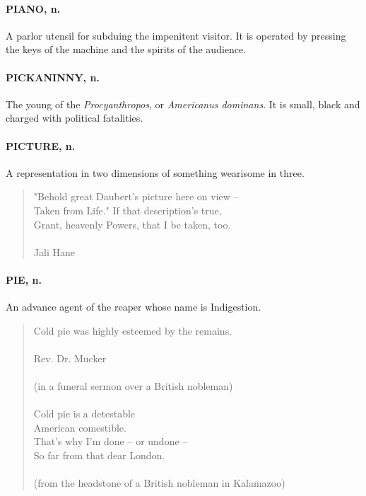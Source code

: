 \documentclass[11pt]{article}
\begin{document}
\paragraph{PIANO, n.}  A parlor utensil for subduing the impenitent visitor.  It
is operated by pressing the keys of the machine and the spirits of the
audience.

\paragraph{PICKANINNY, n.}  The young of the {\em Procyanthropos}, or {\em Americanus
dominans}.  It is small, black and charged with political fatalities.

\paragraph{PICTURE, n.}  A representation in two dimensions of something wearisome
in three.

\begin{quote}   "Behold great Daubert's picture here on view -- \\
  Taken from Life."  If that description's true, \\
  Grant, heavenly Powers, that I be taken, too. \\
 \\
Jali Hane \end{quote}


\paragraph{PIE, n.}  An advance agent of the reaper whose name is Indigestion.

\begin{quote}   Cold pie was highly esteemed by the remains. \\
 \\
Rev. Dr. Mucker\\
  \\
(in a funeral sermon over a British nobleman) \\
\\
   Cold pie is a detestable \\
  American comestible. \\
  That's why I'm done -- or undone -- \\
  So far from that dear London. \\
 \\
(from the headstone of a British nobleman in Kalamazoo) \end{quote}
\end{document}
